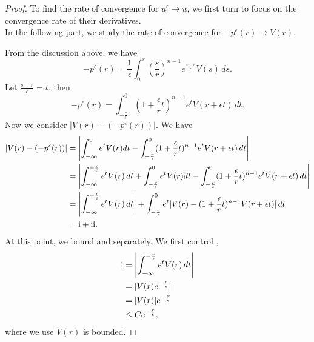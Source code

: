 \documentclass[12pt,reqno]{amsart}
\numberwithin{figure}{section}
\theoremstyle{plain}
\numberwithin{equation}{section}
\newcommand{\RNum}[1]{\uppercase\expandafter{\romannumeral #1\relax}}
\begin{document}
\begin{proof}
To find the rate of convergence for $u^{\epsilon}\rightarrow u$, we first turn to focus on the convergence rate of their derivatives. \\
In the following part, we study the rate of convergence for $-p^{\epsilon}(r)\rightarrow V(r)$.

From the discussion above, we have 
\begin{equation*}
    -p^{\epsilon}(r)= \frac{1}{\epsilon}\int_0^r\left(\frac{s}{r}\right)^{n-1}e^{\frac{s-r}{\epsilon}}V(s)\, ds.
\end{equation*}
Let $\frac{s-r}{\epsilon}=t$, then 
\begin{equation*}
    -p^{\epsilon}(r)=\int_{-\frac{r}{\epsilon}}^0(1+\frac{\epsilon}{r}t)^{n-1}e^tV(r+\epsilon t)\, dt.
\end{equation*}
Now we consider $|V(r)-(-p^{\epsilon}(r))|$. We have
\begin{equation*}
\begin{aligned}
    |V(r)-(-p^{\epsilon}(r))|
    &=\left|\int_{-\infty}^0e^tV(r)dt-\int_{-\frac{r}{\epsilon}}^0(1+\frac{\epsilon}{r}t)^{n-1}e^tV(r+\epsilon t)\, dt\right| \\
    &=\left|\int_{-\infty}^{-\frac{r}{\epsilon}}e^tV(r)\,dt+\int_{-\frac{r}{\epsilon}}^0 e^tV(r)dt -\int_{-\frac{r}{\epsilon}}^0(1+\frac{\epsilon}{r}t)^{n-1}e^tV(r+\epsilon t)\, dt\right| \\
    &= \left|\int_{-\infty}^{-\frac{r}{\epsilon}}e^tV(r)\,dt\right|+\int_{-\frac{r}{\epsilon}}^0 e^t|V(r)-(1+\frac{\epsilon}{r}t)^{n-1}V(r+\epsilon t)|\, dt\\
    &= \text{\RNum{1}} + \text{\RNum{2}}.
\end{aligned}
\end{equation*}
At this point, we bound \RNum{1} and \RNum{2} separately. We first control \RNum{1},
\begin{equation*}
\begin{aligned}
    \text{\RNum{1}} &= \left|\int_{-\infty}^{-\frac{r}{\epsilon}}e^tV(r)\,dt\right|\\
                    &= |V(r)e^{-\frac{r}{\epsilon}}|\\
                    &= |V(r)|e^{-\frac{r}{\epsilon}}\\
                    &\le Ce^{-\frac{r}{\epsilon}},
\end{aligned}
\end{equation*}
where we use $V(r)$ is bounded.


\end{proof}
\end{document}

